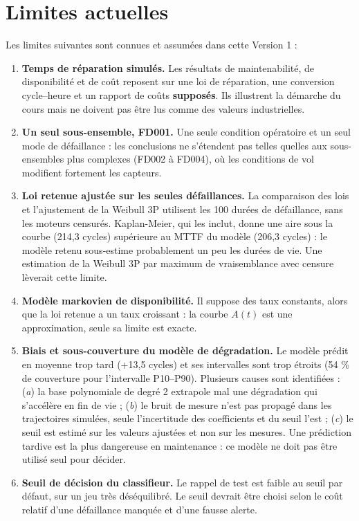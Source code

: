 \section{Limites actuelles}\label{sec:limites}

Les limites suivantes sont connues et assumées dans cette Version 1 :

\begin{enumerate}
\item \textbf{Temps de réparation simulés.} Les résultats de maintenabilité, de disponibilité et de coût reposent sur une loi de réparation, une conversion cycle–heure et un rapport de coûts \textbf{supposés}. Ils illustrent la démarche du cours mais ne doivent pas être lus comme des valeurs industrielles.
\item \textbf{Un seul sous-ensemble, FD001.} Une seule condition opératoire et un seul mode de défaillance : les conclusions ne s'étendent pas telles quelles aux sous-ensembles plus complexes (FD002 à FD004), où les conditions de vol modifient fortement les capteurs.
\item \textbf{Loi retenue ajustée sur les seules défaillances.} La comparaison des lois et l'ajustement de la Weibull 3P utilisent les 100 durées de défaillance, sans les moteurs censurés. Kaplan-Meier, qui les inclut, donne une aire sous la courbe (214,3 cycles) supérieure au MTTF du modèle (206,3 cycles) : le modèle retenu sous-estime probablement un peu les durées de vie. Une estimation de la Weibull 3P par maximum de vraisemblance avec censure lèverait cette limite.
\item \textbf{Modèle markovien de disponibilité.} Il suppose des taux constants, alors que la loi retenue a un taux croissant : la courbe $A(t)$ est une approximation, seule sa limite est exacte.
\item \textbf{Biais et sous-couverture du modèle de dégradation.} Le modèle prédit en moyenne trop tard (+13,5 cycles) et ses intervalles sont trop étroits (54 \% de couverture pour l'intervalle P10–P90). Plusieurs causes sont identifiées : (\emph{a}) la base polynomiale de degré 2 extrapole mal une dégradation qui s'accélère en fin de vie ; (\emph{b}) le bruit de mesure n'est pas propagé dans les trajectoires simulées, seule l'incertitude des coefficients et du seuil l'est ; (\emph{c}) le seuil est estimé sur les valeurs ajustées et non sur les mesures. Une prédiction tardive est la plus dangereuse en maintenance : ce modèle ne doit pas être utilisé seul pour décider.
\item \textbf{Seuil de décision du classifieur.} Le rappel de test est faible au seuil par défaut, sur un jeu très déséquilibré. Le seuil devrait être choisi selon le coût relatif d'une défaillance manquée et d'une fausse alerte.

\end{enumerate}
